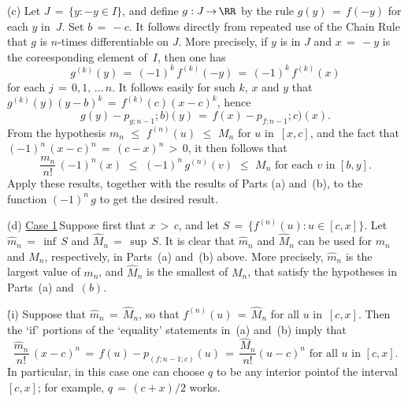         (c) Let $J \,=\, \{y: -y{\in}I\}$, and define $g:J \,{\rightarrow}\, {\RR}$ by the rule $g(y) \,=\, f(-y)$ for each $y$ in~$J$. Set $b \,=\, -c$.
    It follows directly from repeated use of the Chain Rule that $g$ is $n$-times differentiable on $J$.
    More precisely, if $y$ is in $J$ and $x \,=\, -y$ is the coreesponding element of~$I$, then one has
        \begin{displaymath}
        g^{(k)}(y) \,=\, (-1)^{k}\,f^{(k)}(-y) \,=\, (-1)^{k}\,f^{(k)}(x)        \end{displaymath}
     for each $j \,=\, 0, 1, \,{\ldots}\,n$. It follows easily for such $k$, $x$ and $y$ that $g^{(k)}(y)(y-b)^{k} \,=\, f^{(k)}(c)(x-c)^{k}$, hence
        \begin{displaymath}
        g(y) - p_{g;n-1};b)(y) \,=\, f(x) - p_{f;n-1};c)(x).
        \end{displaymath}
    From the hypothesis $m_{n}\,\,{\leq}\,\,f^{(n)}(u)\,\,{\leq}\,\,M_{n}$ for $u$ in~$[x,c]$,
    and the fact that $(-1)^{n}\,(x-c)^{n} \,=\, (c-x)^{n}\,>\,0$, it then follows that
        \begin{displaymath}
        \frac{m_{n}}{n!}\,(-1)^{n}(x)\,\,{\leq}\,\,(-1)^{n}\,g^{(n)}(v)\,\,{\leq}\,\,M_{n}
    \mbox{ for each $v$ in $[b,y]$}.
        \end{displaymath}
    Apply these results, together with the results of Parts (a) and~(b), to the function $(-1)^{n}\,g$ to get the desired result.

\V

        (d) \underline{Case 1}\,Suppose first that $x\,>\,c$, and let $S \,=\, \{f^{(n)}(u): u{\in}[c,x]\}$.
    Let $\hat{m}_{n} \,=\, {\inf}\,S$ and $\hat{M}_{n} \,=\, {\sup}\,S$. It is clear that $\hat{m}_{n}$ and $\hat{M}_{n}$ can be used for $m_{n}$ and $M_{n}$,
    respectively, in Parts~(a) and~(b) above. More precisely, $\hat{m}_{n}$ is the largest value of $m_{n}$, and $\hat{M}_{n}$ is the smallest of $M_{n}$,
    that satisfy the hypotheses in Parts~(a) and~$(b)$.

        \h (i)\,\,Suppose that $\hat{m}_{n} \,=\, \hat{M}_{n}$, so that $f^{(n)}(u) \,=\, \hat{M}_{n}$ for all $u$ in~$[c,x]$.
    Then the `if' portions of the `equality' statements in~(a) and~(b) imply that
        \begin{displaymath}
         \frac{\hat{m}_{n}}{n!}\,(x-c)^{n} \,=\, f(u)- p_{(f;n-1;c)}(u) \,=\, \frac{\hat{M}_{n}}{n!}(u-c)^{n} \mbox{ for all $u$ in $[c,x]$}.
        \end{displaymath}
    In particular, in this case one can choose $q$ to be any interior pointof the interval $[c,x]$; for example, $q \,=\, (c+x)/2$ works.

